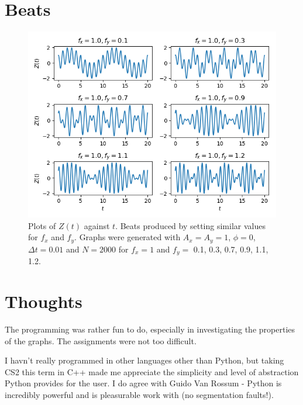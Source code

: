 \documentclass{article}
\begin{document}
\section{Beats}
		\begin{figure}[H]
			\centering
			\includegraphics[scale=0.7]{plots/beats.png}
			\caption
			{
				Plots of $Z(t)$ against $t$. Beats produced by setting similar values for $f_x$ and $f_y$. Graphs were generated with $A_x = A_y = 1$, $\phi = 0$, $\Delta{t} = 0.01$ and $N = 2000$ for $f_x = 1$ and $f_y =$ 0.1, 0.3, 0.7, 0.9, 1.1, 1.2.     
			}
		\end{figure}

\section{Thoughts}
	The programming was rather fun to do, especially in investigating the properties of the graphs. The assignments were not too difficult.
	
	I havn't really programmed in other languages other than Python, but taking CS2 this term in C++ made me appreciate the simplicity and level of abstraction Python provides for the user. I do agree with Guido Van Rossum - Python is incredibly powerful and is pleasurable work with (no segmentation faults!).
\end{document}
